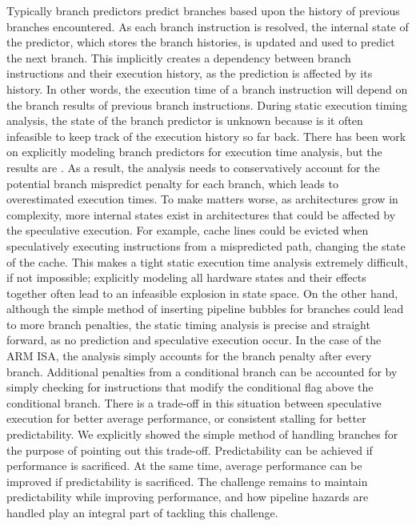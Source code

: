 Typically branch predictors predict branches based upon the history of previous branches encountered.  
As each branch instruction is resolved, the internal state of the predictor, which stores the branch histories, is updated and used to predict the next branch.
This implicitly creates a dependency between branch instructions and their execution history, as the prediction is affected by its history.
In other words, the execution time of a branch instruction will depend on the branch results of previous branch instructions.
During static execution timing analysis, the state of the branch predictor is unknown because is it often infeasible to keep track of the execution history so far back.   
There has been work on explicitly modeling branch predictors for execution time analysis, but the results are .
As a result, the analysis needs to conservatively account for the potential branch mispredict penalty for each branch, which leads to overestimated execution times.
To make matters worse, as architectures grow in complexity, more internal states exist in architectures that could be affected by the speculative execution. 
For example, cache lines could be evicted when speculatively executing instructions from a mispredicted path, changing the state of the cache.  
This makes a tight static execution time analysis extremely difficult, if not impossible; explicitly modeling all hardware states and their effects together often lead to an infeasible explosion in state space. 
On the other hand, although the simple method of inserting pipeline bubbles for branches could lead to more branch penalties, the static timing analysis is precise and straight forward, as no prediction and speculative execution occur. 
In the case of the ARM ISA, the analysis simply accounts for the branch penalty after every branch. 
Additional penalties from a conditional branch can be accounted for by simply checking for instructions that modify the conditional flag above the conditional branch.
There is a trade-off in this situation between speculative execution for better average performance, or consistent stalling for better predictability.
We explicitly showed the simple method of handling branches for the purpose of pointing out this trade-off.
Predictability can be achieved if performance is sacrificed. 
At the same time, average performance can be improved if predictability is sacrificed. 
The challenge remains to maintain predictability while improving performance, and how pipeline hazards are handled play an integral part of tackling this challenge.           

